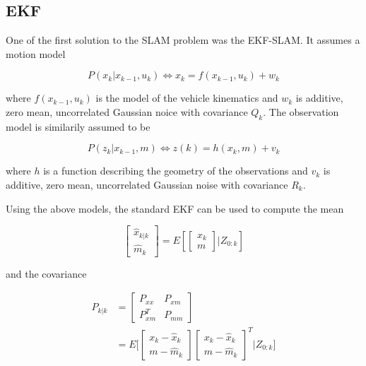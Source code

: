 

\subsection{EKF}

One of the first solution to the SLAM problem was the EKF-SLAM\cite{EKFSLAM}. It assumes a motion model 

\begin{equation}
    P(x_k|x_{k-1},u_k) \iff  x_k = f(x_{k-1},u_k) + w_k
\end{equation}

where $f(x_{k-1},u_k)$ is the model of the vehicle kinematics and $w_k$ is additive, zero mean, uncorrelated Gaussian noice with covariance $Q_k$. The observation model is similarily assumed to be 

\begin{equation}
    P(z_k|x_{k-1},m) \iff  z(k) = h(x_{k},m) + v_k
\end{equation}

where $h$ is a function describing the geometry of the observations and $v_k$ is additive, zero mean, uncorrelated Gaussian noise with covariance $R_k$. 

Using the above models, the standard EKF can be used to compute the mean 

\begin{equation}
    \begin{bmatrix} \hat{x}_{k|k} \\ \hat{m}_k \end{bmatrix} = E[\begin{bmatrix} x_k \\ m \end{bmatrix} | Z_{0:k}]
\end{equation}

and the covariance

\begin{align}
    P_{k|k} &= \begin{bmatrix} P_{xx} & P_{xm} \\ P^T_{xm} & P_{mm} \end{bmatrix} \\
     &= E\bigg[\begin{bmatrix} x_k-\hat{x}_k \\ m - \hat{m}_k\end{bmatrix}\begin{bmatrix} x_k-\hat{x}_k \\ m - \hat{m}_k\end{bmatrix}^T \bigg| Z_{0:k} \bigg]
\end{align}

